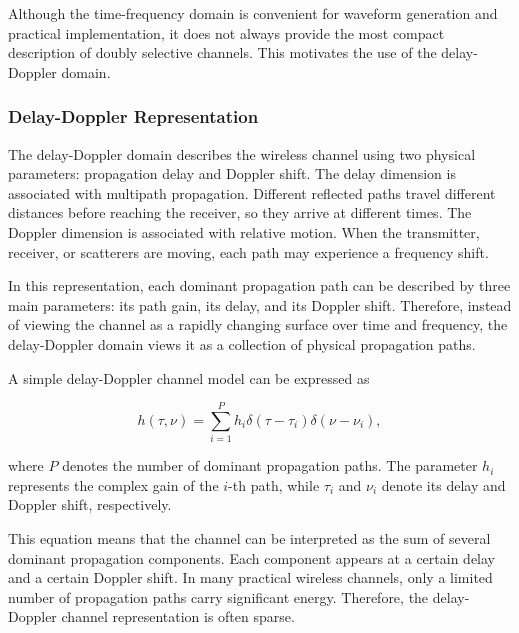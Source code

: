 Although the time-frequency domain is convenient for waveform generation and practical implementation, it does not always provide the most compact description of doubly selective channels. This motivates the use of the delay-Doppler domain.

\subsubsection{Delay-Doppler Representation}

The delay-Doppler domain describes the wireless channel using two physical parameters: propagation delay and Doppler shift. The delay dimension is associated with multipath propagation. Different reflected paths travel different distances before reaching the receiver, so they arrive at different times. The Doppler dimension is associated with relative motion. When the transmitter, receiver, or scatterers are moving, each path may experience a frequency shift.

In this representation, each dominant propagation path can be described by three main parameters: its path gain, its delay, and its Doppler shift. Therefore, instead of viewing the channel as a rapidly changing surface over time and frequency, the delay-Doppler domain views it as a collection of physical propagation paths.

A simple delay-Doppler channel model can be expressed as

\begin{equation}
h(\tau,\nu)
=
\sum_{i=1}^{P}
h_i
\delta(\tau-\tau_i)
\delta(\nu-\nu_i),
\end{equation}

where \(P\) denotes the number of dominant propagation paths. The parameter \(h_i\) represents the complex gain of the \(i\)-th path, while \(\tau_i\) and \(\nu_i\) denote its delay and Doppler shift, respectively.

This equation means that the channel can be interpreted as the sum of several dominant propagation components. Each component appears at a certain delay and a certain Doppler shift. In many practical wireless channels, only a limited number of propagation paths carry significant energy. Therefore, the delay-Doppler channel representation is often sparse.


